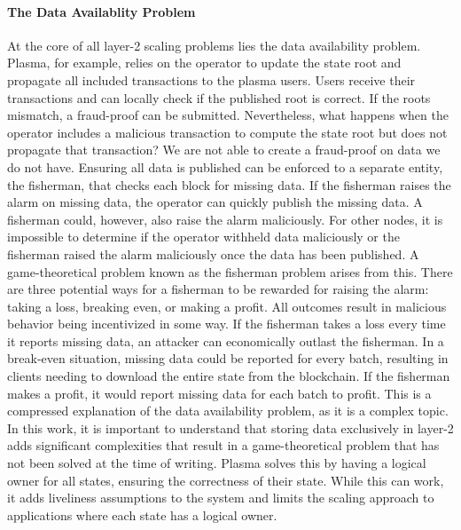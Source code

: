 \documentclass[../../thesis.tex]{subfiles}
\begin{document}
\paragraph{The Data Availablity Problem}
At the core of all layer-2 scaling problems lies the data availability problem. Plasma, for example, relies on the operator to update the state root and propagate all included transactions to the plasma users. Users receive their transactions and can locally check if the published root is correct. If the roots mismatch, a fraud-proof can be submitted. Nevertheless, what happens when the operator includes a malicious transaction to compute the state root but does not propagate that transaction? We are not able to create a fraud-proof on data we do not have. Ensuring all data is published can be enforced to a separate entity, the fisherman, that checks each block for missing data. If the fisherman raises the alarm on missing data, the operator can quickly publish the missing data. A fisherman could, however, also raise the alarm maliciously. For other nodes, it is impossible to determine if the operator withheld data maliciously or the fisherman raised the alarm maliciously once the data has been published. A game-theoretical problem known as the fisherman problem \cite{ethereum2018data} arises from this. There are three potential ways for a fisherman to be rewarded for raising the alarm: taking a loss, breaking even, or making a profit. All outcomes result in malicious behavior being incentivized in some way. If the fisherman takes a loss every time it reports missing data, an attacker can economically outlast the fisherman. In a break-even situation, missing data could be reported for every batch, resulting in clients needing to download the entire state from the blockchain. If the fisherman makes a profit, it would report missing data for each batch to profit. This is a compressed explanation of the data availability problem, as it is a complex topic. In this work, it is important to understand that storing data exclusively in layer-2 adds significant complexities that result in a game-theoretical problem that has not been solved at the time of writing. Plasma solves this by having a logical owner for all states, ensuring the correctness of their state.  While this can work, it adds liveliness assumptions to the system and limits the scaling approach to applications where each state has a logical owner. 
\end{document}
